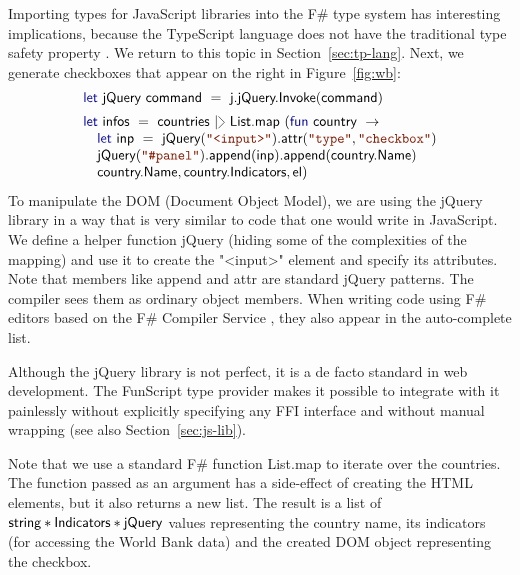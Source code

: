 \documentclass[submission,copyright,creativecommons]{eptcs}
\newcommand{\rang}{\begin{picture}(5,7)
\put(.1,2.5){\rotatebox{135}{\line(1,0){6.0}}}
\put(.1,2.5){\rotatebox{225}{\line(1,0){6.0}}}
\end{picture}}
\newcommand{\kvd}[1]{\textnormal{\textcolor{kvdclr}{\sffamily #1}}}
\newcommand{\str}[1]{\textnormal{\textcolor{strclr}{\ttfamily "#1"}}}
\newcommand{\ident}[1]{\textnormal{\sffamily #1}}
\begin{document}
Importing types for JavaScript libraries into the F\# type system has interesting implications,
because the TypeScript language does not have the traditional type safety property \cite{ms-safets}.
We return to this topic in Section~\ref{sec:tp-lang}. Next, we generate checkboxes that appear on the
right in Figure~\ref{fig:wb}:
%
\begin{equation*}
\begin{array}{lll}
 \kvd{let}~\ident{jQuery}~\ident{command}~=~\ident{j.jQuery.Invoke}(\ident{command})
 \\[0.5em]
 \kvd{let}~\ident{infos}~=~\ident{countries}~|\rang~\ident{List.map}~(\kvd{fun}~\ident{country}~\rightarrow \\
 \quad \kvd{let}~\ident{inp}~=~\ident{jQuery}(\str{<input>})\ident{.attr}(\str{type}, \str{checkbox}) \\
 \quad \ident{jQuery}(\str{\#panel})\ident{.append}(\ident{inp})\ident{.append}(\ident{country.Name}) \\
 \quad \ident{country.Name}, \ident{country.Indicators}, \ident{el}) \\
\end{array}
\end{equation*}
%
To manipulate the DOM (Document Object Model), we are using the jQuery library in a way that is
very similar to code that one would write in JavaScript. We define a helper function \ident{jQuery}
(hiding some of the complexities of the mapping) and use it to create the \str{<input>} element and
specify its attributes. Note that members like \ident{append} and \ident{attr} are standard
jQuery patterns. The compiler sees them as ordinary object members. When writing code using F\# editors
based on the F\# Compiler Service \cite{fsharp-fcs}, they also appear in the auto-complete list.

Although the jQuery library is not perfect, it is a de facto standard in web development. The
FunScript type provider makes it possible to integrate with it painlessly without explicitly
specifying any FFI interface and without manual wrapping (see also Section~\ref{sec:js-lib}).

Note that we use a standard F\# function \ident{List.map} to iterate over the countries. The
function passed as an argument has a side-effect of creating the HTML elements, but it also returns
a new list. The result is a list of $\ident{string}\ast\ident{Indicators}\ast\ident{jQuery}$ values
representing the country name, its indicators (for accessing the World Bank data) and the created
DOM object representing the checkbox.
\end{document}
